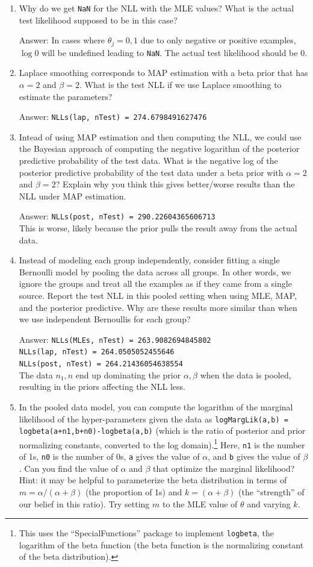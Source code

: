 \documentclass{article}
\def\ans#1{\par\gre{Answer: #1}}
\def\blu#1{{\color{blu}#1}}
\def\gre#1{{\color{gre}#1}}
\def\enum#1{\begin{enumerate}#1\end{enumerate}}
\begin{document}
\enum{
\item \blu{Why do we get \texttt{NaN} for the NLL with the MLE values? What is the actual test likelihood supposed to be in this case?}
\ans{
In cases where $\theta_j=0,1$ due to only negative or positive examples, $\log 0$ will be undefined leading to \texttt{NaN}. The actual test likelihood should be 0. 
}
\item Laplace smoothing corresponds to  MAP estimation with a beta prior that has $\alpha=2$ and $\beta=2$. \blu{What is the test NLL if we use Laplace smoothing to estimate the parameters?} 
\ans{
\texttt{NLLs(lap, nTest) = 274.6798491627476}
}
\item Intead of using MAP estimation and then computing the NLL, we could use the Bayesian approach of computing the negative logarithm of the posterior predictive probability of the test data. \blu{What is the negative log of the posterior predictive probability of the test data under a beta prior with $\alpha=2$ and $\beta=2$? Explain why you think this gives better/worse results than the NLL under MAP estimation.}
\ans{
\texttt{NLLs(post, nTest) = 290.22604365606713}\\
This is worse, likely because the prior pulls the result away from the actual data.
}
\item Instead of modeling each group independently, consider fitting a single Bernoulli model by pooling the data across all groups. In other words, we ignore the groups and treat all the examples as if they came from a single source. \blu{Report the test NLL in this pooled setting when using MLE, MAP, and the posterior predictive. Why are these results more similar than when we use independent Bernoullis for each group?}
\ans{
\texttt{NLLs(MLEs, nTest) = 263.9082694845802\\
NLLs(lap, nTest) = 264.0505052455646\\
NLLs(post, nTest) = 264.21436054638554}\\
The data $n_1,n$ end up dominating the prior $\alpha,\beta$ when the data is pooled, resulting in the priors affecting the NLL less.
}
\pagebreak
\item In the pooled data model, you can compute the logarithm of the marginal likelihood of the hyper-parameters given the data as \texttt{logMargLik(a,b) = logbeta(a+n1,b+n0)-logbeta(a,b)} (which is the ratio of posterior and prior normalizing constants, converted to the log domain).\footnote{This uses the ``SpecialFunctions'' package to implement \texttt{logbeta}, the logarithm of the beta function (the beta function is the normalizing constant of the beta distribution).} Here, \texttt{n1} is the number of 1s, \texttt{n0} is the number of 0s, \texttt{a} gives the value of $\alpha$, and \texttt{b} gives the value of $\beta$. \blu{Can you find the value of $\alpha$ and $\beta$ that optimize the marginal likelihood?} Hint: it may be helpful to parameterize the beta distribution in terms of $m=\alpha/(\alpha+\beta)$ (the proportion of 1s) and $k = (\alpha+\beta)$ (the ``strength'' of our belief in this ratio). Try setting $m$ to the MLE value of $\theta$ and varying $k$.
}
\end{document}
